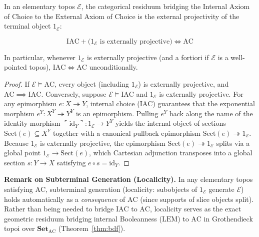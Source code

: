 \begin{theorem}\label{thm:iac-to-ac}%
%

In an elementary topos $\mathcal{E}$, the categorical residuum bridging the Internal Axiom of Choice to the External Axiom of Choice is the external projectivity of the terminal object $1_{\mathcal{E}}$:

\[
  \mathrm{IAC} + \bigl(1_{\mathcal{E}} \text{ is externally projective}\bigr) \iff \mathrm{AC}
\]

In particular, whenever $1_{\mathcal{E}}$ is externally projective (and a fortiori if $\mathcal{E}$ is a well-pointed topos), $\mathrm{IAC} \iff \mathrm{AC}$ unconditionally.

\end{theorem}

\begin{proof}
If $\mathcal{E} \models \mathrm{AC}$, every object (including $1_{\mathcal{E}}$) is externally projective, and $\mathrm{AC} \implies \mathrm{IAC}$. Conversely, suppose $\mathcal{E} \models \mathrm{IAC}$ and $1_{\mathcal{E}}$ is externally projective. For any epimorphism $e: X \twoheadrightarrow Y$, internal choice ($\mathrm{IAC}$) guarantees that the exponential morphism $e^Y: X^Y \twoheadrightarrow Y^Y$ is an epimorphism. Pulling $e^Y$ back along the name of the identity morphism $\ulcorner \mathrm{id}_Y \urcorner: 1_{\mathcal{E}} \to Y^Y$ yields the internal object of sections $\mathrm{Sect}(e) \subseteq X^Y$ together with a canonical pullback epimorphism $\mathrm{Sect}(e) \twoheadrightarrow 1_{\mathcal{E}}$. Because $1_{\mathcal{E}}$ is externally projective, the epimorphism $\mathrm{Sect}(e) \twoheadrightarrow 1_{\mathcal{E}}$ splits via a global point $1_{\mathcal{E}} \to \mathrm{Sect}(e)$, which Cartesian adjunction transposes into a global section $s: Y \to X$ satisfying $e \circ s = \mathrm{id}_Y$.
\end{proof}

\noindent\textbf{Remark on Subterminal Generation (Localicity).} In any elementary topos satisfying $\mathrm{AC}$, subterminal generation (localicity: subobjects of $1_{\mathcal{E}}$ generate $\mathcal{E}$) holds automatically as a \emph{consequence} of $\mathrm{AC}$ (since supports of slice objects split). Rather than being needed to bridge $\mathrm{IAC}$ to $\mathrm{AC}$, localicity serves as the exact geometric residuum bridging internal Booleanness ($\mathrm{LEM}$) to $\mathrm{AC}$ in Grothendieck topoi over $\mathbf{Set}_{\mathrm{AC}}$ (Theorem~\ref{thm:bdf}).

